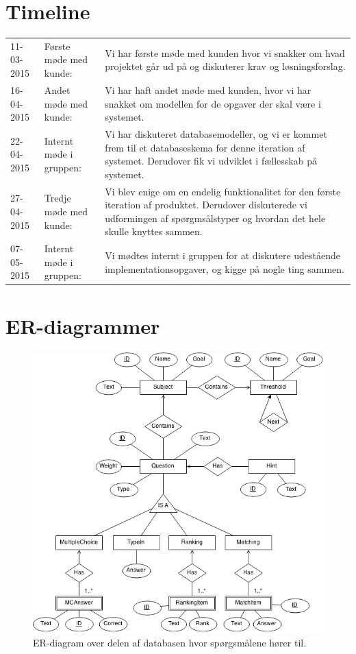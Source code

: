 \documentclass[11pt, a4paper]{article}
\begin{document}
\section{Timeline}
\label{sec:timeline}
\begin{tabular}{l l p{8cm}}
11-03-2015 & Første møde med kunde: & Vi har første møde med kunden hvor vi snakker om hvad projektet går ud på og diskuterer krav og løsningsforslag. \\
16-04-2015 & Andet møde med kunde: & Vi har haft andet møde med kunden, hvor vi har snakket om modellen for de opgaver der skal være i systemet. \\
22-04-2015 & Internt møde i gruppen: & Vi har diskuteret databasemodeller, og vi er kommet frem til et databaseskema for denne iteration af systemet. Derudover fik vi udviklet i fællesskab på systemet. \\
27-04-2015 & Tredje møde med kunde: & Vi blev enige om en endelig funktionalitet for den første iteration af produktet. Derudover diskuterede vi udformingen af spørgmsålstyper og hvordan det hele skulle knyttes sammen. \\
07-05-2015 & Internt møde i gruppen: & Vi mødtes internt i gruppen for at diskutere udestående implementationsopgaver, og kigge på nogle ting sammen. \\
\end{tabular}


{}

\section{ER-diagrammer}
\label{sec:er_diagrams}
\begin{figure}[h!]
    \centering
    \includegraphics[width=0.8\linewidth]{figures/er_diagram/Qdb.png}
    \caption{ER-diagram over delen af databasen hvor spørgsmålene hører til.}
    \label{fig:er_diagram_question}
\end{figure}
\end{document}
